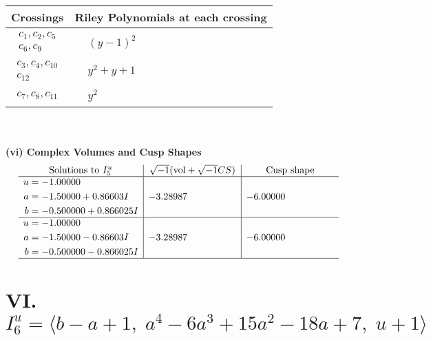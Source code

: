 \documentclass[1p]{elsarticle_modified}
\theoremstyle{definition}
\newcommand{\I}{\sqrt{-1}}
\begin{document}
\begin{tabular}{m{50pt}|m{274pt}}
Crossings & \hspace{64pt}Riley Polynomials at each crossing \\
\hline $$\begin{aligned}c_{1},c_{2},c_{5}\\c_{6},c_{9}\end{aligned}$$&$\begin{aligned}
&(y-1)^2
\end{aligned}$\\
\hline $$\begin{aligned}c_{3},c_{4},c_{10}\\c_{12}\end{aligned}$$&$\begin{aligned}
&y^2+y+1
\end{aligned}$\\
\hline $$\begin{aligned}c_{7},c_{8},c_{11}\end{aligned}$$&$\begin{aligned}
&y^2
\end{aligned}$\\
\hline
\end{tabular}\\~\\
\newpage\flushleft \textbf{(vi) Complex Volumes and Cusp Shapes}
$$\begin{array}{c|c|c}  
\text{Solutions to }I^u_{5}& \I (\text{vol} + \sqrt{-1}CS) & \text{Cusp shape}\\
 \hline 
\begin{aligned}
u &= -1.00000\phantom{ +0.000000I} \\
a &= -1.50000 + 0.86603 I \\
b &= -0.500000 + 0.866025 I\end{aligned}
 & -3.28987\phantom{ +0.000000I} & -6.00000\phantom{ +0.000000I} \\ \hline\begin{aligned}
u &= -1.00000\phantom{ +0.000000I} \\
a &= -1.50000 - 0.86603 I \\
b &= -0.500000 - 0.866025 I\end{aligned}
 & -3.28987\phantom{ +0.000000I} & -6.00000\phantom{ +0.000000I}\\
 \hline 
 \end{array}$$\newpage\newpage\renewcommand{\arraystretch}{1}
\centering \section*{VI. $I^u_{6}= \langle b- a+1,\;a^4-6 a^3+15 a^2-18 a+7,\;u+1 \rangle$}
\end{document}
